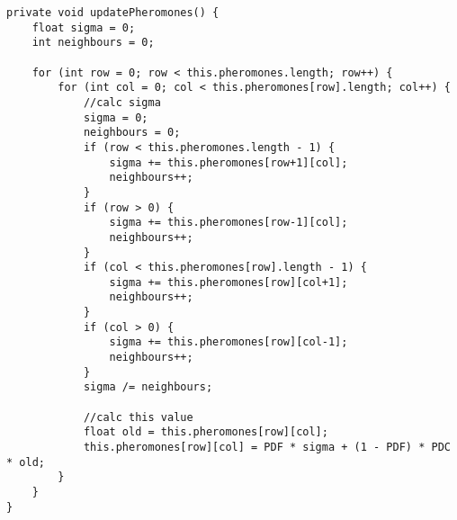 \documentclass[a4paper]{article}
\begin{document}
\begin{lstlisting}[title=Pheromonupdate]
private void updatePheromones() {
	float sigma = 0;
	int neighbours = 0;
	
	for (int row = 0; row < this.pheromones.length; row++) {
		for (int col = 0; col < this.pheromones[row].length; col++) {
			//calc sigma
			sigma = 0;
			neighbours = 0;			
			if (row < this.pheromones.length - 1) {
				sigma += this.pheromones[row+1][col];
				neighbours++;
			}
			if (row > 0) {
				sigma += this.pheromones[row-1][col];
				neighbours++;
			}
			if (col < this.pheromones[row].length - 1) {
				sigma += this.pheromones[row][col+1];
				neighbours++;
			}
			if (col > 0) {
				sigma += this.pheromones[row][col-1];
				neighbours++;
			}
			sigma /= neighbours;
			
			//calc this value
			float old = this.pheromones[row][col];
			this.pheromones[row][col] = PDF * sigma + (1 - PDF) * PDC * old;
		}
	}
}
\end{lstlisting}
\end{document}
